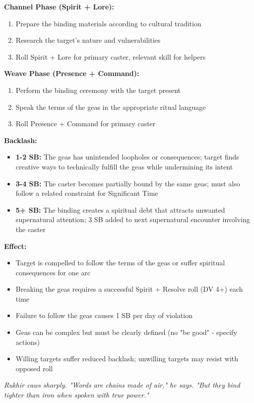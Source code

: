 \documentclass[12pt,twoside]{book}
\newcommand{\shadow}[1]{\textit{#1}}
\begin{document}
\textbf{Channel Phase (Spirit + Lore):}
\begin{enumerate}
\item Prepare the binding materials according to cultural tradition
\item Research the target's nature and vulnerabilities
\item Roll Spirit + Lore for primary caster, relevant skill for helpers
\end{enumerate}

\textbf{Weave Phase (Presence + Command):}
\begin{enumerate}
\item Perform the binding ceremony with the target present
\item Speak the terms of the geas in the appropriate ritual language
\item Roll Presence + Command for primary caster
\end{enumerate}

\textbf{Backlash:}
\begin{itemize}
\item \textbf{1-2 SB:} The geas has unintended loopholes or consequences; target finds creative ways to technically fulfill the geas while undermining its intent
\item \textbf{3-4 SB:} The caster becomes partially bound by the same geas; must also follow a related constraint for Significant Time
\item \textbf{5+ SB:} The binding creates a spiritual debt that attracts unwanted supernatural attention; 3 SB added to next supernatural encounter involving the caster
\end{itemize}

\textbf{Effect:}
\begin{itemize}
\item Target is compelled to follow the terms of the geas or suffer spiritual consequences for one arc
\item Breaking the geas requires a successful Spirit + Resolve roll (DV 4+) each time
\item Failure to follow the geas causes 1 SB per day of violation
\item Geas can be complex but must be clearly defined (no "be good" - specify actions)
\item Willing targets suffer reduced backlash; unwilling targets may resist with opposed roll
\end{itemize}

\shadow{Rukhir caws sharply. "Words are chains made of air," he says. "But they bind tighter than iron when spoken with true power."}
\end{document}
